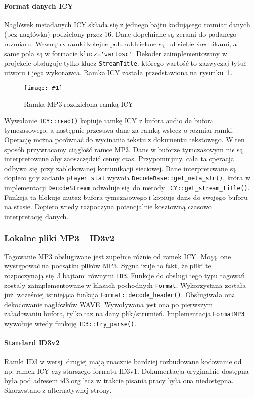 \documentclass[polish]{aghengthesis}
\newcommand{\imgint}[4]{
	\begin{figure}[{#4}]
		\centering
		\texttt{[image: \#1]}
		\caption{#2}
		\label{#1}
	\end{figure}
}
\newcommand{\imgh}[3]{\imgint{#1}{#2}{#3}{H}}
\begin{document}
			\paragraph{Format danych ICY}
				Nagłówek metadanych ICY składa się z jednego bajtu kodującego rozmiar danych (bez nagłówka) podzielony przez 16. Dane dopełniane są zerami do podanego rozmiaru. Wewnątrz ramki kolejne pola oddzielone są od siebie średnikami, a same pola są w formacie \lstinline|klucz='wartosc'|. Dekoder zaimplementowany w projekcie obsługuje tylko klucz \lstinline|StreamTitle|, którego wartość to zazwyczaj tytuł utworu i jego wykonawca. Ramka ICY została przedstawiona na rysunku~\ref{3/PicoRadio-icy}.
				
			\imgh{3/PicoRadio-icy}{Ramka MP3 rozdzielona ramką ICY}{0.9}
				
			Wywołanie \lstinline|ICY::read()| kopiuje ramkę ICY z bufora audio do bufora tymczasowego, a następnie przesuwa dane za ramką wstecz o rozmiar ramki. Operację można porównać do wycinania tekstu z dokumentu tekstowego. W ten sposób przywracamy ciągłość ramce MP3. Dane w buforze tymczasowym nie są interpretowane aby zaoszczędzić cenny czas. Przypomnijmy, cała ta operacja odbywa się przy zablokowanej komunikacji sieciowej. Dane interpretowane są dopiero gdy zadanie \lstinline|player stat| wywoła \lstinline|DecodeBase::get_meta_str()|, która w implementacji \lstinline|DecodeStream| odwołuje się do metody \lstinline|ICY::get_stream_title()|. Funkcja ta blokuje mutex bufora tymczasowego i kopiuje dane do swojego buforu na stosie. Dopiero wtedy rozpoczyna potencjalnie kosztowną czasowo interpretację danych.
		
		\subsubsection{Lokalne pliki MP3 -- ID3v2}
			Tagowanie MP3 obsługiwane jest zupełnie różnie od ramek ICY. Mogą one występować na początku plików MP3. Sygnalizuje to fakt, że pliki te rozpoczynają się 3 bajtami równymi \lstinline|ID3|. Funkcje do obsługi tego typu tagowań zostały zaimplementowane w klasach pochodnych \lstinline|Format|. Wykorzystana została już wcześniej istniejąca funkcja \lstinline|Format::decode_header()|. Obsługiwała ona dekodowanie nagłówków WAVE. Wywoływana jest ona po pierwszym załadowaniu bufora, tylko raz na dany plik/strumień. Implementacja \lstinline|FormatMP3| wywołuje wtedy funkcję \lstinline|ID3::try_parse()|.
			
			\paragraph{Standard ID3v2}
			Ramki ID3 w wersji drugiej mają znacznie bardziej rozbudowane kodowanie od np. ramek ICY czy starszego formatu ID3v1. Dokumentacja oryginalnie dostępna była pod adresem \href{id3.org}{id3.org} lecz w trakcie pisania pracy była ona niedostępna. Skorzystano z alternatywnej strony\textsuperscript{\cite{id3_spec_mutagen}}.
			
\end{document}
